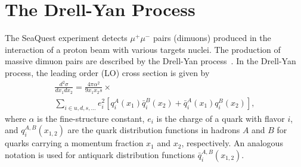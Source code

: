 \documentclass[reprint,aps,unsortedaddress,superscriptaddress,prl,floatfix,showpacs,linenumbers,final]{revtex4-2}
\begin{document}

\section{The Drell-Yan Process}
\label{sec:drell-yan}
The SeaQuest experiment detects $\mu^+\mu^-$ pairs (dimuons) produced in the interaction of a proton
beam with various targets nuclei. The production of massive dimuon pairs are described by the Drell-Yan
process~\cite{drell1970}. In the Drell-Yan process, the leading order (LO) cross section is given by
\begin{multline}
	\frac{d^2\sigma}{dx_1dx_2}=\frac{4\pi \alpha^2}{9x_1x_2s} \times
	\label{eq:DYCross} \\
	\sum_{i\in u,d,s,\dots} e_i^2 \left[q_i^A\left(x_1\right) \bar q_i^B\left(x_2\right) + \bar q_i^A\left(x_1\right)
		q_i^B\left(x_2\right)\right],
\end{multline}
where $\alpha$ is the fine-structure constant, $e_i$ is the charge of a quark with flavor $i$,
and $q_i^{A,B}\left(x_{1,2}\right)$ are the quark distribution functions in hadrons $A$ and $B$
for quarks carrying a momentum fraction $x_1$ and $x_2$, respectively.
An analogous notation is used for antiquark distribution functions $\bar q_i^{A,B}\left(x_{1,2}\right)$.
\end{document}
